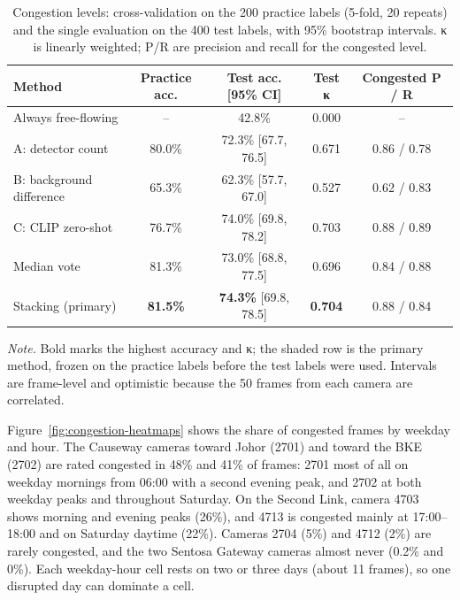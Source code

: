 \begin{table}[htbp]
  \centering
  \small
  \caption{Congestion levels: cross-validation on the 200 practice labels
  (5-fold, 20 repeats) and the single evaluation on the 400 test labels, with
  95\% bootstrap intervals. κ is linearly weighted; P/R are precision and
  recall for the congested level.}
  \label{tab:congestion}
  \begin{tabular}{@{}lcccc@{}}
    \toprule
    Method & Practice acc. & Test acc. [95\% CI] & Test κ & Congested P / R \\
    \midrule
    Always free-flowing      & --     & 42.8\%             & 0.000 & -- \\
    A: detector count        & 80.0\% & 72.3\% [67.7, 76.5] & 0.671 & 0.86 / 0.78 \\
    B: background difference & 65.3\% & 62.3\% [57.7, 67.0] & 0.527 & 0.62 / 0.83 \\
    C: CLIP zero-shot        & 76.7\% & 74.0\% [69.8, 78.2] & 0.703 & 0.88 / 0.89 \\
    Median vote              & 81.3\% & 73.0\% [68.8, 77.5] & 0.696 & 0.84 / 0.88 \\
    \rowcolor{oursrow}
    Stacking (primary)       & \textbf{81.5\%} & \textbf{74.3\%} [69.8, 78.5] & \textbf{0.704} & 0.88 / 0.84 \\
    \bottomrule
  \end{tabular}
  \par\smallskip
  \begin{minipage}{\linewidth}\footnotesize
    \textit{Note.} Bold marks the highest accuracy and κ; the shaded row is the
    primary method, frozen on the practice labels before the test labels were
    used. Intervals are frame-level and optimistic because the 50 frames from
    each camera are correlated.
  \end{minipage}
\end{table}

Figure~\ref{fig:congestion-heatmaps} shows the share of congested frames by
weekday and hour. The Causeway cameras toward Johor (2701) and toward the BKE
(2702) are rated congested in 48\% and 41\% of frames: 2701 most of all on
weekday mornings from 06:00 with a second evening peak, and 2702 at both weekday
peaks and throughout Saturday. On the Second Link, camera 4703 shows morning and
evening peaks (26\%), and 4713 is congested mainly at 17:00--18:00 and on
Saturday daytime (22\%). Cameras 2704 (5\%) and 4712 (2\%) are rarely
congested, and the two Sentosa Gateway cameras almost never (0.2\% and 0\%).
Each weekday-hour cell rests on two or three days (about 11 frames), so one
disrupted day can dominate a cell.

